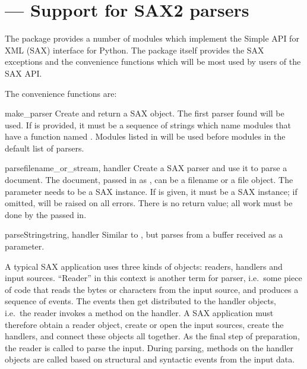 \section{ ---
         Support for SAX2 parsers}




The  package provides a number of modules which
implement the Simple API for XML (SAX) interface for Python.  The
package itself provides the SAX exceptions and the convenience
functions which will be most used by users of the SAX API.

The convenience functions are:

\begin{funcdesc}{make_parser}{}
  Create and return a SAX  object.  The first parser
  found will be used.  If  is provided, it must be a
  sequence of strings which name modules that have a function named
  .  Modules listed in 
  will be used before modules in the default list of parsers.
\end{funcdesc}

\begin{funcdesc}{parse}{filename_or_stream, handler}
  Create a SAX parser and use it to parse a document.  The document,
  passed in as , can be a filename or a file
  object.  The  parameter needs to be a SAX
   instance.  If  is given,
  it must be a SAX  instance; if omitted, 
   will be raised on all errors.  There
  is no return value; all work must be done by the 
  passed in.
\end{funcdesc}

\begin{funcdesc}{parseString}{string, handler}
  Similar to , but parses from a buffer 
  received as a parameter.
\end{funcdesc}

A typical SAX application uses three kinds of objects: readers,
handlers and input sources.  ``Reader'' in this context is another
term for parser, i.e.\ some piece of code that reads the bytes or
characters from the input source, and produces a sequence of events.
The events then get distributed to the handler objects, i.e.\ the
reader invokes a method on the handler.  A SAX application must
therefore obtain a reader object, create or open the input sources,
create the handlers, and connect these objects all together.  As the
final step of preparation, the reader is called to parse the input.
During parsing, methods on the handler objects are called based on
structural and syntactic events from the input data.

